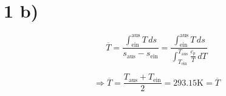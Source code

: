\section*{1 b)}

\[
\overline{T} = \frac{\int_{\text{ein}}^{\text{aus}} T \, ds}{s_{\text{aus}} - s_{\text{ein}}} = \frac{\int_{\text{ein}}^{\text{aus}} T \, ds}{\int_{T_{\text{ein}}}^{T_{\text{aus}}} \frac{c_p}{T} \, dT}
\]

\[
\Rightarrow \overline{T} = \frac{T_{\text{aus}} + T_{\text{ein}}}{2} = 293.15 \text{K} = \overline{T}
\]

